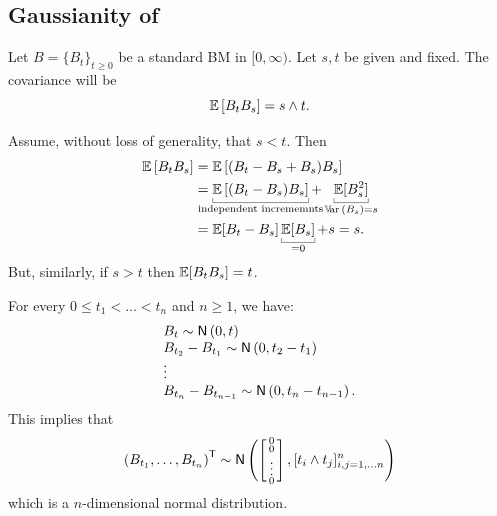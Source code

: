 \documentclass[12pt]{report}
\begin{document}
\subsection{Gaussianity of \bwm}
\begin{proposition}
	Let $B={\{B_{t}\}}_{t\geq 0}$ be a standard BM in $[0,\infty)$. Let $s,t$ be given and fixed. The covariance will be 
	\begin{equation*}
		\mathbb{E}\left[B_{t}B_{s}\right]=s\wedge t.
	\end{equation*}
\end{proposition}
\begin{fancyproof}
	Assume, without loss of generality, that $s<t$. Then
	\begin{align*}
		\evs\left[B_{t}B_{s}\right]&=\evs\left[(B_{t}-B_{s}+B_{s})B_{s}\right]\\
		&=\ubracketthin{\evs\left[(B_{t}-B_{s})B_{s}\right]}_{\claptext{independent incrememnts}}+\ubracketthin{\evs[B^{2}_{s}]}_{\var(B_{s})=s}\\
		&=\evs[B_{t}-B_{s}]\ubracketthin{\evs[B_{s}]}_{=0}+s=s.
	\end{align*}
	But, similarly, if $s>t$ then $\mathbb{E}[B_{t}B_{s}]=t$.
\end{fancyproof}
\begin{remark}
	For every 0$\leq t_{1}<\ldots<t_{n}$ and $n\geq 1$, we have:
	\begin{equation*}
		\begin{array}{l}
			B_{t}\sim\mathsf{N}\left(0,t\right)\\
			B_{t_{2}}-B_{t_{1}}\sim\mathsf{N}\left(0,t_{2}-t_{1}\right)\\
			\vdots\\
			B_{t_{n}}-B_{t_{n-1}}\sim\mathsf{N}\left(0, t_{n}-t_{n-1}\right).
		\end{array}
	\end{equation*}
	This implies that 
	\begin{equation*}
		\left(B_{t_{1}},\ldots, B_{t_{n}}\right)^{\mathsf{T}}\sim\mathsf{N}\left(\left[\begin{smallmatrix}
				0\\0\\ \vdots\\0\\
		\end{smallmatrix}\right],[t_{i}\wedge t_{j}]^{n}_{i,j=1,\ldots n}\right)
	\end{equation*}
	which is a $n$-dimensional normal distribution.
\end{remark}
\end{document}
